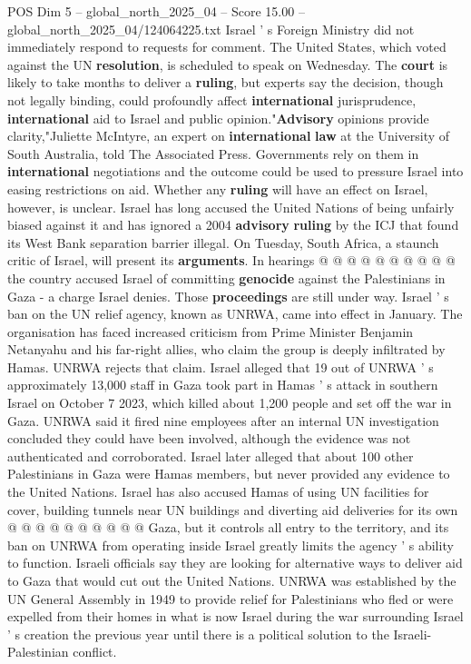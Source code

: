 \begin{textsample}{POS Dim 5 – global\_north\_2025\_04 – Score 15.00 – global\_north\_2025\_04/124064225.txt}
Israel ' s Foreign Ministry did not immediately respond to requests for comment.
The United States, which voted against the UN \textbf{resolution}, is scheduled to speak on Wednesday.
The \textbf{court} is likely to take months to deliver a \textbf{ruling}, but experts say the decision, though not legally binding, could profoundly affect \textbf{international} jurisprudence, \textbf{international} aid to Israel and public opinion."\textbf{Advisory} opinions provide clarity,"Juliette McIntyre, an expert on \textbf{international} \textbf{law} at the University of South Australia, told The Associated Press.
Governments rely on them in \textbf{international} negotiations and the outcome could be used to pressure Israel into easing restrictions on aid.
Whether any \textbf{ruling} will have an effect on Israel, however, is unclear.
Israel has long accused the United Nations of being unfairly biased against it and has ignored a 2004 \textbf{advisory} \textbf{ruling} by the ICJ that found its West Bank separation barrier illegal.
On Tuesday, South Africa, a staunch critic of Israel, will present its \textbf{arguments}.
In hearings @ @ @ @ @ @ @ @ @ @ the country accused Israel of committing \textbf{genocide} against the Palestinians in Gaza - a charge Israel denies.
Those \textbf{proceedings} are still under way.
Israel ' s ban on the UN relief agency, known as UNRWA, came into effect in January.
The organisation has faced increased criticism from Prime Minister Benjamin Netanyahu and his far-right allies, who claim the group is deeply infiltrated by Hamas.
UNRWA rejects that claim.
Israel alleged that 19 out of UNRWA ' s approximately 13,000 staff in Gaza took part in Hamas ' s attack in southern Israel on October 7 2023, which killed about 1,200 people and set off the war in Gaza.
UNRWA said it fired nine employees after an internal UN investigation concluded they could have been involved, although the evidence was not authenticated and corroborated.
Israel later alleged that about 100 other Palestinians in Gaza were Hamas members, but never provided any evidence to the United Nations.
Israel has also accused Hamas of using UN facilities for cover, building tunnels near UN buildings and diverting aid deliveries for its own @ @ @ @ @ @ @ @ @ @ Gaza, but it controls all entry to the territory, and its ban on UNRWA from operating inside Israel greatly limits the agency ' s ability to function.
Israeli officials say they are looking for alternative ways to deliver aid to Gaza that would cut out the United Nations.
UNRWA was established by the UN General Assembly in 1949 to provide relief for Palestinians who fled or were expelled from their homes in what is now Israel during the war surrounding Israel ' s creation the previous year until there is a political solution to the Israeli-Palestinian conflict.

\end{textsample}

